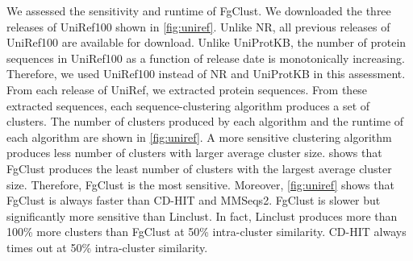 \documentclass[11pt,letterpaper]{article}
\begin{document}
We assessed the sensitivity and runtime of FgClust.
We downloaded the three releases of UniRef100 \citep{suzek2007uniref} shown in \cref{fig:uniref}.
Unlike NR, all previous releases of UniRef100 are available for download.
Unlike UniProtKB, the number of protein sequences in UniRef100 as a function of release date is monotonically increasing.
Therefore, we used UniRef100 instead of NR and UniProtKB in this assessment.
From each release of UniRef, we extracted protein sequences.
From these extracted sequences, each sequence-clustering algorithm produces a set of clusters.
The number of clusters produced by each algorithm and the runtime of each algorithm are shown in \cref{fig:uniref}.
A more sensitive clustering algorithm produces less number of clusters with larger average cluster size.
 shows that FgClust produces the least number of clusters with the largest average cluster size.
Therefore, FgClust is the most sensitive.
Moreover, \cref{fig:uniref} shows that FgClust is always faster than CD-HIT and MMSeqs2.
FgClust is slower but significantly more sensitive than Linclust.
In fact, Linclust produces more than 100\% more clusters than FgClust at 50\% intra-cluster similarity.
CD-HIT always times out at 50\% intra-cluster similarity.
\end{document}
